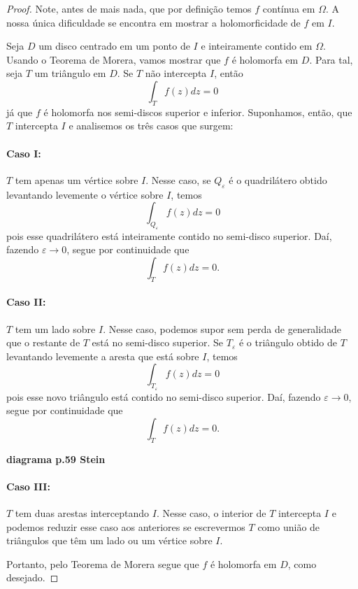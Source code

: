 \begin{proof}
Note, antes de mais nada, que por definição temos $f$ contínua em $\Omega$.
A nossa única dificuldade se encontra em mostrar a holomorficidade de $f$ em $I$.

Seja $D$ um disco centrado em um ponto de $I$ e inteiramente contido em $\Omega$.
Usando o Teorema de Morera, vamos mostrar que $f$ é holomorfa em $D$. Para tal,
seja $T$ um triângulo em $D$. Se $T$ não intercepta $I$, então
\begin{equation*}
    \int_T f(z) dz = 0
\end{equation*}
já que $f$ é holomorfa nos semi-discos superior e inferior. Suponhamos, então,
que $T$ intercepta $I$ e analisemos os três casos que surgem:
\paragraph{Caso I:} $T$ tem apenas um vértice sobre $I$. Nesse caso, se 
$Q_{\varepsilon}$ é o quadrilátero obtido levantando levemente o vértice sobre $I$,
temos
\begin{equation*}
    \int_{Q_{\varepsilon}} f(z) dz = 0
\end{equation*}
pois esse quadrilátero está inteiramente contido no semi-disco superior. Daí,
fazendo $\varepsilon\to 0$, segue por continuidade que
\begin{equation*}
    \int_T f(z) dz = 0.
\end{equation*}

\paragraph{Caso II:} $T$ tem um lado sobre $I$. Nesse caso, podemos supor sem perda
de generalidade que o restante de $T$ está no semi-disco superior. Se $T_{\varepsilon}$
é o triângulo obtido de $T$ levantando levemente a aresta que está sobre $I$, temos
\begin{equation*}
    \int_{T_{\varepsilon}} f(z) dz = 0
\end{equation*}
pois esse novo triângulo está contido no semi-disco superior. Daí, fazendo 
$\varepsilon\to 0$, segue por continuidade que
\begin{equation*}
    \int_T f(z) dz = 0.
\end{equation*}

\begin{center}
    \textbf{diagrama p.59 Stein}
\end{center}

\paragraph{Caso III:} $T$ tem duas arestas interceptando $I$. Nesse caso, o interior
de $T$ intercepta $I$ e podemos reduzir esse caso aos anteriores se escrevermos $T$
como união de triângulos que têm um lado ou um vértice sobre $I$.

Portanto, pelo Teorema de Morera segue que $f$ é holomorfa em $D$, como desejado.
\end{proof}

